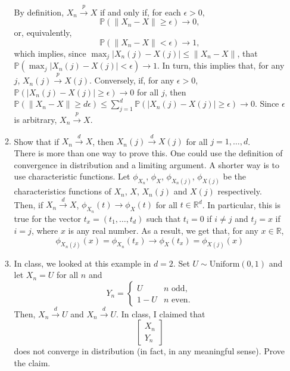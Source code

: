 \documentclass[12pt]{article}
\begin{document}
\begin{enumerate}
\begin{enumerate}
By definition, $X_n \stackrel{p}{\rightarrow} X$ if and only if, for each $\epsilon > 0$, 
\[
\mathbb{P}( \| X_n - X \| \geq \epsilon ) %
\to 0,
\]
or, equivalently,
\[
\mathbb{P}( \| X_n - X \| < \epsilon ) %
\to 1,
\]
which implies, since $\max_j | X_n(j) - X(j)| \leq \| X_n - X \| $, that  $\mathbb{P}( \max_j | X_n(j) - X(j)| < \epsilon ) \to 1$. In turn, this implies that, for any $j$, $X_n(j) \stackrel{p}{\rightarrow} X(j)$. Conversely,  if, for any $\epsilon > 0$, $\mathbb{P}( | X_n(j) - X(j)| \geq \epsilon) \to 0 $ for all $j$, then  $\mathbb{P}( \| X_n - X \| \geq d \epsilon ) \leq \sum_{j=1}^d \mathbb{P}(| X_n(j) - X(j)| \geq \epsilon ) \to 0$. Since $\epsilon$ is arbitrary, $X_n \stackrel{p}{\rightarrow} X$.

\color{black}


 \item Show that if $X_n \stackrel{d}{\rightarrow} X$, then $X_n(j) \stackrel{d}{\rightarrow} X(j)$ for all $j=1,\ldots,d$.\\
\color{blue}
There is more than one way to prove this. One could use the definition of convergence in distribution and a limiting argument. A shorter way is to use characteristic functions. Let $\phi_{X_n}$, $\phi_X$, $\phi_{X_n(j)}$, $\phi_{X(j)}$ be the characteristics functions of $X_n$, $X$, $X_n(j)$ and $X(j)$ respectively. Then, if $X_n \stackrel{d}{\rightarrow} X$, $\phi_{X_n}(t) \to \phi_X(t)$ for all $t \in \mathbb{R}^d$. In particular, this is true for the vector $t_x = (t_1,\ldots,t_d)$ such that $t_i = 0$ if $i \neq j$ and $t_j = x$ if $i=j$, where $x$ is any real number. As a result, we get that, for any $x \in \mathbb{R}$,
\[
\phi_{X_n(j)}(x) =  \phi_{X_n}(t_x) \to \phi_X(t_x) = \phi_{X(j)}(x)
\]
\color{black}
 \item In class, we looked at this example in $d=2$. Set $U \sim \mathrm{Uniform}(0,1)$ and let $X_n = U$ for all $n$ and 
\[
Y_n = \left\{ \begin{array}{ll}
 U & n \text{ odd},\\
 1 - U & n \text{ even}.
 \end{array}
 \right.	
\]
Then, $X_n  \stackrel{d}{\rightarrow} U$ and $X_n  \stackrel{d}{\rightarrow} U$. In class, I claimed that 
\[
\left[ \begin{array}{c}
 X_n\\
 Y_n	
 \end{array}
\right]
\]
does not converge in distribution (in fact, in any meaningful sense). Prove the claim.



\end{enumerate}
\end{enumerate}
\end{document}
